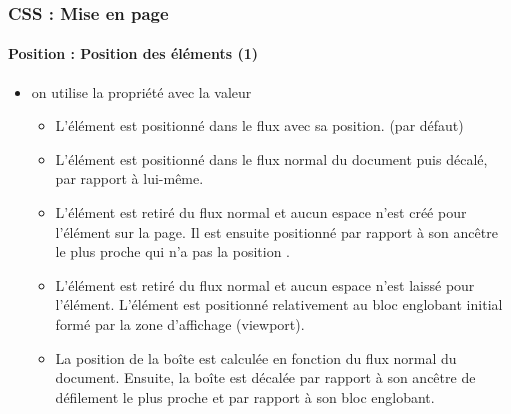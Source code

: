\documentclass[xcolor=table]{beamer}
\begin{document}
\begin{frame}[fragile]
\frametitle{CSS : Mise en page}
\framesubtitle{Position : Position des éléments (1)}

\begin{itemize}
	\item on utilise la propriété  avec la valeur
	\begin{itemize}
		\item {} L'élément est positionné dans le flux avec sa position. (par défaut)
		
		\item {} L'élément est positionné dans le flux normal du document puis décalé, par rapport à lui-même.
		
		\item {} L'élément est retiré du flux normal et aucun espace n'est créé pour l'élément sur la page. Il est ensuite positionné par rapport à son ancêtre le plus proche qui n'a pas la position .
		
		\item {} L'élément est retiré du flux normal et aucun espace n'est laissé pour l'élément. L'élément est positionné relativement au bloc englobant initial formé par la zone d'affichage (viewport).
		
		\item {} La position de la boîte est calculée en fonction du flux normal du document. Ensuite, la boîte est décalée par rapport à son ancêtre de défilement le plus proche et par rapport à son bloc englobant. 
	\end{itemize}
\end{itemize}

\end{frame}
\end{document}
